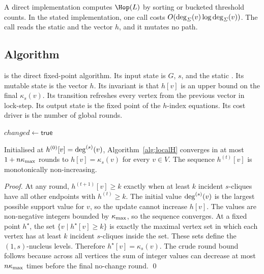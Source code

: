 A direct implementation computes \(\Hop(L)\) by sorting or bucketed threshold counts.
%
In the stated implementation, one call costs \(O(\deg_{\varSigma}(v)\log\deg_{\varSigma}(v))\).
%
The call reads the static \cpi{} and the vector \(h\), and it mutates no path.

\subsection{Algorithm \localH}\label{sec:localh}

\localH{} is the direct fixed-point algorithm.
%
Its input state is \(G\), \(s\), and the static \cpi{}.
%
Its mutable state is the vector \(h\).
%
Its invariant is that \(h[v]\) is an upper bound on the final \(\kappa_s(v)\).
%
Its transition refreshes every vertex from the previous vector in lock-step.
%
Its output state is the fixed point of the \(h\)-index equations.
%
Its cost driver is the number of global rounds.

\begin{algorithm}[t]
\algfontsize
\caption{\localH}
\label{alg:localH}

\(\mathit{changed}\gets\textsf{true}\)\;
\end{algorithm}

\begin{lemma}\label{lem:hindex-fixed-point}
Initialised at \(h^{(0)}[v]=\deg^{(s)}(v)\), Algorithm~\ref{alg:localH} converges in at most \(1+n\kappa_{\max}\) rounds to \(h[v]=\kappa_s(v)\) for every \(v\in V\).
%
The sequence \(h^{(t)}[v]\) is monotonically non-increasing.
\end{lemma}

\begin{proof}
At any round, \(h^{(t+1)}[v]\ge k\) exactly when at least \(k\) incident \(s\)-cliques have all other endpoints with \(h^{(t)}\ge k\).
%
The initial value \(\deg^{(s)}(v)\) is the largest possible support value for \(v\), so the update cannot increase \(h[v]\).
%
The values are non-negative integers bounded by \(\kappa_{\max}\), so the sequence converges.
%
At a fixed point \(h^\star\), the set \(\{v\mid h^\star[v]\ge k\}\) is exactly the maximal vertex set in which each vertex has at least \(k\) incident \(s\)-cliques inside the set.
%
These sets define the \((1,s)\)-nucleus levels.
%
Therefore \(h^\star[v]=\kappa_s(v)\).
%
The crude round bound follows because across all vertices the sum of integer values can decrease at most \(n\kappa_{\max}\) times before the final no-change round.
%
\qed
\end{proof}

